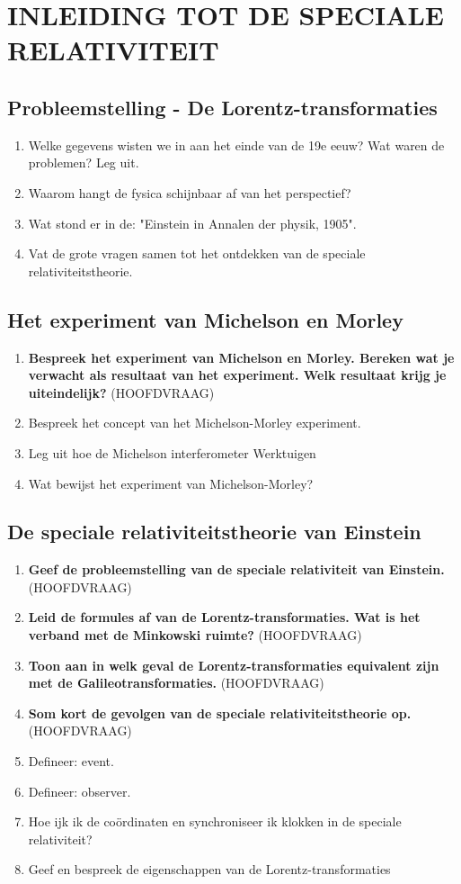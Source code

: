 \documentclass[12pt]{article}
\begin{document}
    \section{INLEIDING TOT DE SPECIALE RELATIVITEIT}
    \subsection{Probleemstelling - De Lorentz-transformaties}
    \begin{enumerate}
        \item Welke gegevens wisten we in aan het einde van de 19e eeuw? Wat waren de problemen? Leg uit.
        \item Waarom hangt de fysica schijnbaar af van het perspectief?
        \item Wat stond er in de: "Einstein in Annalen der physik, 1905".
        \item Vat de grote vragen samen tot het ontdekken van de speciale relativiteitstheorie.
    \end{enumerate}
    \subsection{Het experiment van Michelson en Morley}
    \begin{enumerate}
        \item \textbf{Bespreek het experiment van Michelson en Morley. Bereken wat je verwacht als resultaat van het experiment. Welk resultaat krijg je uiteindelijk?} (HOOFDVRAAG)
        \item Bespreek het concept van het Michelson-Morley experiment.
        \item Leg uit hoe de Michelson interferometer Werktuigen
        \item Wat bewijst het experiment van Michelson-Morley?
    \end{enumerate}
    \subsection{De speciale relativiteitstheorie van Einstein}
    \begin{enumerate}
        \item \textbf{Geef de probleemstelling van de speciale relativiteit van Einstein.} (HOOFDVRAAG)
        \item \textbf{Leid de formules af van de Lorentz-transformaties. Wat is het verband met de Minkowski ruimte?} (HOOFDVRAAG)
        \item \textbf{Toon aan in welk geval de Lorentz-transformaties equivalent zijn met de Galileotransformaties.} (HOOFDVRAAG)
        \item \textbf{Som kort de gevolgen van de speciale relativiteitstheorie op.} (HOOFDVRAAG)
        \item Defineer: event.
        \item Defineer: observer.
        \item Hoe ijk ik de coördinaten en synchroniseer ik klokken in de speciale relativiteit?
        \item Geef en bespreek de eigenschappen van de Lorentz-transformaties
    \end{enumerate}
\end{document}
